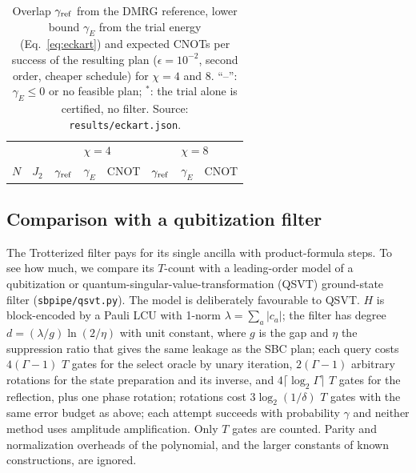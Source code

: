 \documentclass[aps,pra,twocolumn,superscriptaddress,nofootinbib]{revtex4-2}
\begin{document}
\begin{table}[t]
\caption{Overlap $\gamma_{\rm ref}$ from the DMRG reference, lower bound $\gamma_E$ from the trial energy (Eq.~\eqref{eq:eckart}) and expected CNOTs per success of the
resulting plan ($\epsilon=10^{-2}$, second order, cheaper schedule) for $\chi=4$ and 8. ``--'': $\gamma_E\le0$ or no feasible plan; $^*$: the trial alone is certified, no filter. Source:
\texttt{results/eckart.json}.}
\label{tab:eckart}
\begin{ruledtabular}
\begin{tabular}{rrrrrrrr}
 & & \multicolumn{3}{c}{$\chi=4$} & \multicolumn{3}{c}{$\chi=8$}\\
$N$ & $J_2$ & $\gamma_{\rm ref}$ & $\gamma_E$ & CNOT & $\gamma_{\rm ref}$ & $\gamma_E$ & CNOT\\
\midrule

\end{tabular}
\end{ruledtabular}
\end{table}


\subsection{Comparison with a qubitization filter}
\label{sec:qsvt}

The Trotterized filter pays for its single ancilla with product-formula steps. To see how much, we compare its $T$-count with a leading-order model of a
qubitization or quantum-singular-value-transformation (QSVT) ground-state filter (\texttt{sbpipe/qsvt.py}). The model is deliberately favourable to QSVT. $H$ is block-encoded by a Pauli LCU with
1-norm $\lambda=\sum_a|c_a|$; the filter has degree $d=(\lambda/g)\ln(2/\eta)$ with unit constant, where $g$ is the gap and $\eta$ the suppression ratio that gives the same leakage as the SBC plan;
each query costs $4(\Gamma-1)$ $T$ gates for the select oracle by unary iteration, $2(\Gamma-1)$ arbitrary rotations for the state preparation and its inverse, and $4\lceil\log_2\Gamma\rceil$ $T$ gates for the reflection,
plus one phase rotation; rotations cost $3\log_2(1/\delta)$ $T$ gates with the same error budget as above; each attempt succeeds with probability $\gamma$ and neither method uses amplitude amplification.
Only $T$ gates are counted. Parity and normalization overheads of the polynomial, and the larger constants of known constructions, are ignored.
\end{document}
